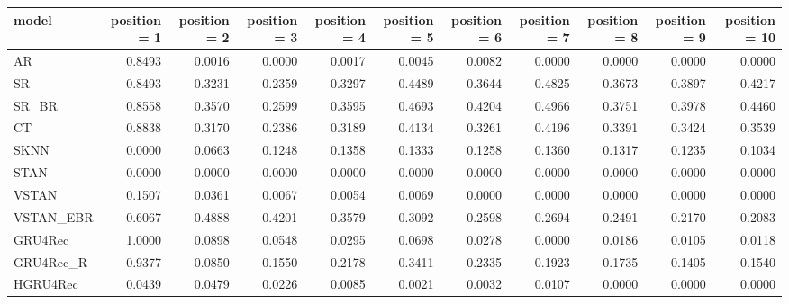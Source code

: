 \begin{tabular}{lrrrrrrrrrr}
\toprule
     model &  position = 1 &  position = 2 &  position = 3 &  position = 4 &  position = 5 &  position = 6 &  position = 7 &  position = 8 &  position = 9 &  position = 10 \\
\midrule
        AR &        0.8493 &        0.0016 &        0.0000 &        0.0017 &        0.0045 &        0.0082 &        0.0000 &        0.0000 &        0.0000 &         0.0000 \\
        SR &        0.8493 &        0.3231 &        0.2359 &        0.3297 &        0.4489 &        0.3644 &        0.4825 &        0.3673 &        0.3897 &         0.4217 \\
     SR\_BR &        0.8558 &        0.3570 &        0.2599 &        0.3595 &        0.4693 &        0.4204 &        0.4966 &        0.3751 &        0.3978 &         0.4460 \\
        CT &        0.8838 &        0.3170 &        0.2386 &        0.3189 &        0.4134 &        0.3261 &        0.4196 &        0.3391 &        0.3424 &         0.3539 \\
      SKNN &        0.0000 &        0.0663 &        0.1248 &        0.1358 &        0.1333 &        0.1258 &        0.1360 &        0.1317 &        0.1235 &         0.1034 \\
      STAN &        0.0000 &        0.0000 &        0.0000 &        0.0000 &        0.0000 &        0.0000 &        0.0000 &        0.0000 &        0.0000 &         0.0000 \\
     VSTAN &        0.1507 &        0.0361 &        0.0067 &        0.0054 &        0.0069 &        0.0000 &        0.0000 &        0.0000 &        0.0000 &         0.0000 \\
 VSTAN\_EBR &        0.6067 &        0.4888 &        0.4201 &        0.3579 &        0.3092 &        0.2598 &        0.2694 &        0.2491 &        0.2170 &         0.2083 \\
   GRU4Rec &        1.0000 &        0.0898 &        0.0548 &        0.0295 &        0.0698 &        0.0278 &        0.0000 &        0.0186 &        0.0105 &         0.0118 \\
 GRU4Rec\_R &        0.9377 &        0.0850 &        0.1550 &        0.2178 &        0.3411 &        0.2335 &        0.1923 &        0.1735 &        0.1405 &         0.1540 \\
  HGRU4Rec &        0.0439 &        0.0479 &        0.0226 &        0.0085 &        0.0021 &        0.0032 &        0.0107 &        0.0000 &        0.0000 &         0.0000 \\
\bottomrule
\end{tabular}
